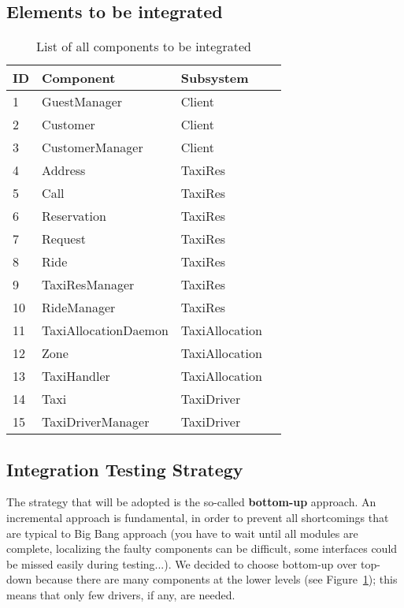 \documentclass[a4paper, 11pt]{article}
\newcounter{tc}
\begin{document}
\subsection{Elements to be integrated} 
\label{sub:elements_to_be_integrated}

\begin{figure}[htb]
    \centering
    \label{fig:testplan}
\end{figure}


\begin{table}
    \centering
    \begin{tabular}{| l | l | p{} | p{} |}
    \hline
    \textbf{ID} & \textbf{Component} & \textbf{Subsystem} \\
    \hline
    1 & GuestManager & Client\\
    \hline
    2 & Customer & Client\\
    \hline
    3 & CustomerManager & Client\\
    \hline
    4 & Address & TaxiRes\\
    \hline
    5 & Call & TaxiRes\\
    \hline
    6 & Reservation & TaxiRes\\
    \hline
    7 & Request & TaxiRes\\
    \hline
    8 & Ride & TaxiRes\\
    \hline
    9 & TaxiResManager & TaxiRes\\
    \hline
    10 & RideManager & TaxiRes\\
    \hline
    11 & TaxiAllocationDaemon & TaxiAllocation\\
    \hline
    12 & Zone & TaxiAllocation\\
    \hline
    13 & TaxiHandler & TaxiAllocation\\
    \hline
    14 & Taxi & TaxiDriver\\
    \hline
    15 & TaxiDriverManager & TaxiDriver\\
    \hline
    \end{tabular}
    \caption{List of all components to be integrated}
    \label{tab:components-integration}
\end{table}

\subsection{Integration Testing Strategy} 
\label{sub:integration_testing_strategy}
The strategy that will be adopted is the so-called \textbf{bottom-up} approach. An incremental approach is fundamental, in order to prevent all shortcomings that are typical to Big Bang approach (you have to wait until all modules are complete, localizing the faulty components can be difficult, some interfaces could be missed easily during testing...).
We decided to choose bottom-up over top-down because there are many components at the lower levels (see Figure~\ref{fig:testplan}); this means that only few drivers, if any, are needed.
\end{document}
